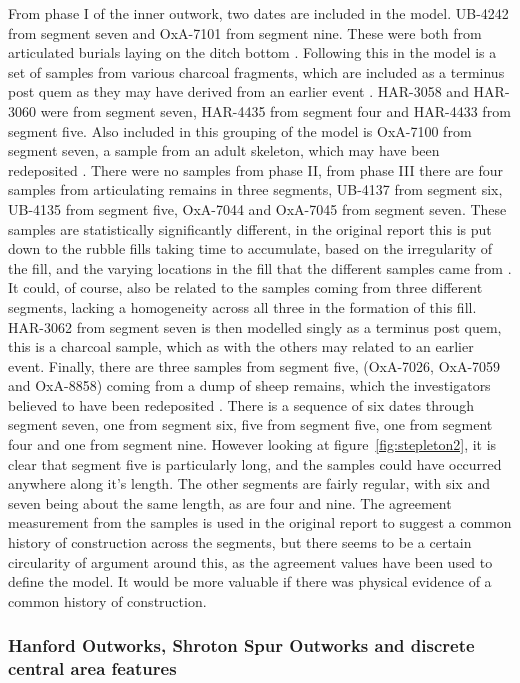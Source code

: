 From phase I of the inner outwork, two dates are included in the model. UB-4242 from segment seven and OxA-7101 from segment nine. These were both from articulated burials laying on the ditch bottom  \cite[395]{Mercer:2008fk}. Following this in the model is a set of samples from various charcoal fragments, which are included as a terminus post quem as they may have derived from an earlier event \cite[395]{Mercer:2008fk}. HAR-3058 and HAR-3060 were from segment seven, HAR-4435 from segment four and HAR-4433 from segment five. Also included in this grouping of the model is OxA-7100 from segment seven, a sample from an adult skeleton, which may have been redeposited \cite[396]{Mercer:2008fk}. There were no samples from phase II, from phase III there are four samples from articulating remains in three segments, UB-4137 from segment six, UB-4135 from segment five, OxA-7044 and OxA-7045 from segment seven. These samples are statistically significantly different, in the original report this is put down to the rubble fills taking time to accumulate, based on the irregularity of the fill, and the varying locations in the fill that the different samples came from \cite[395]{Mercer:2008fk}. It could, of course, also be related to the samples coming from three different segments, lacking a homogeneity across all three in the formation of this fill. HAR-3062 from segment seven is then modelled singly as a terminus post quem, this is a charcoal sample, which as with the others may related to an earlier event. Finally, there are three samples from segment five, (OxA-7026, OxA-7059 and OxA-8858) coming from a dump of sheep remains, which the investigators believed to have been redeposited \cite[396]{Mercer:2008fk}. There is a sequence of six dates through segment seven, one from segment six, five from segment five, one from segment four and one from segment nine. However looking at figure~\ref{fig:stepleton2}, it is clear that segment five is particularly long, and the samples could have occurred anywhere along it's length. The other segments are fairly regular, with six and seven being about the same length, as are four and nine. The agreement measurement from the samples is used in the original report to suggest a common history of construction across the segments, \cite[396]{Mercer:2008fk} but there seems to be a certain circularity of argument around this, as the agreement values have been used to define the model. It would be more valuable if there was physical evidence of a common history of construction.

\subsubsection{Hanford Outworks, Shroton Spur Outworks and discrete central area features}

